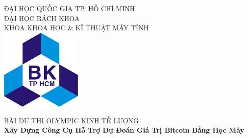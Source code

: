 


\begin{titlepage}

\newcommand{\HRule}{\rule{\linewidth}{0.5mm}} %

\center %
 

\textsc{\Large ĐẠI HỌC QUỐC GIA TP. HỒ CHÍ MINH}\\[0.25cm] %
\textsc{\Large ĐẠI HỌC BÁCH KHOA}\\[0.25cm] %
\textsc{\large KHOA KHOA HỌC \& KĨ THUẬT MÁY TÍNH}\\[0.4cm] %
\vspace{1cm}
\includegraphics[width=0.3\textwidth]{BK.jpg}\\[0.4cm]
\vspace{1cm}

\textsc{\Large{BÀI DỰ THI OLYMPIC KINH TẾ LƯỢNG}}\\[0.5cm] 

{ \Large \bfseries Xây Dựng Công Cụ Hỗ Trợ Dự Đoán Giá Trị Bitcoin Bằng Học Máy}\\[0.7cm] %
\begin{flushright}
\vspace{1cm}

\vspace{1cm}
\end{flushright}
 


\end{titlepage}
